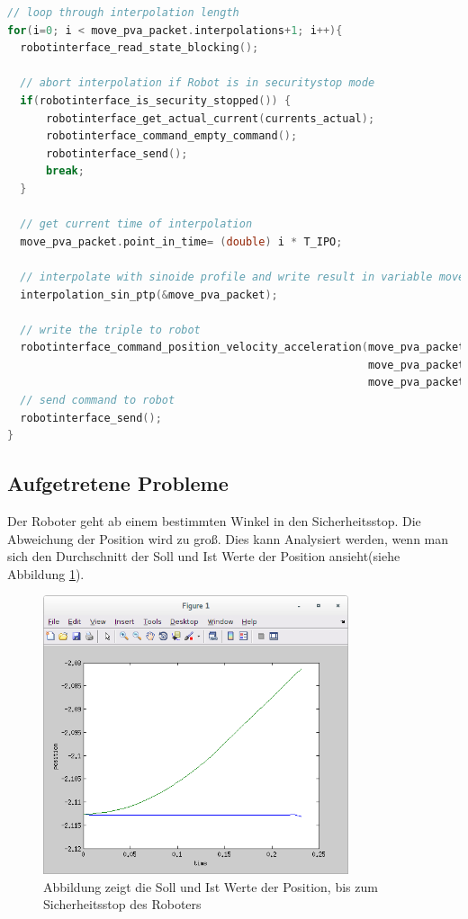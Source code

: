 \begin{lstlisting}[language=C,caption={Interpolation eines Berechneten Weges}, label=lst:interpolate,captionpos=b]
// loop through interpolation length  
for(i=0; i < move_pva_packet.interpolations+1; i++){
  robotinterface_read_state_blocking();

  // abort interpolation if Robot is in securitystop mode
  if(robotinterface_is_security_stopped()) {
      robotinterface_get_actual_current(currents_actual);
      robotinterface_command_empty_command();
      robotinterface_send();
      break;
  }

  // get current time of interpolation 
  move_pva_packet.point_in_time= (double) i * T_IPO;

  // interpolate with sinoide profile and write result in variable move_pva_packet
  interpolation_sin_ptp(&move_pva_packet);

  // write the triple to robot
  robotinterface_command_position_velocity_acceleration(move_pva_packet.pva.position,
                                                        move_pva_packet.pva.velocity,
                                                        move_pva_packet.pva.acceleration);
  // send command to robot
  robotinterface_send();
}
\end{lstlisting}

\subsection{Aufgetretene Probleme}
\label{sub:capi-problems_rel}


Der Roboter geht ab einem bestimmten Winkel in den Sicherheitsstop. Die Abweichung der Position wird zu groß. Dies kann Analysiert werden, wenn man sich den Durchschnitt der Soll und Ist Werte der Position ansieht(siehe Abbildung \ref{fig:position_join1}).

\begin{figure}[H]
  \centering
    \includegraphics[width=0.8\textwidth]{pic/joint1_position_capi.png}
      \caption[Soll und Ist Werte der Position]{Abbildung zeigt die Soll und Ist Werte der Position, bis zum Sicherheitsstop des Roboters}
      \label{fig:position_join1}
\end{figure}

